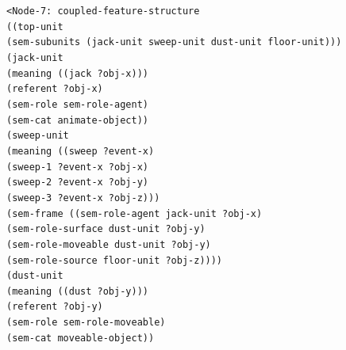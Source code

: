 {\footnotesize{\tt <Node-7: coupled-feature-structure
\\ ((top-unit
\\ \hspace*{5mm} (sem-subunits (jack-unit sweep-unit dust-unit floor-unit)))
\\ \hspace*{2mm}(jack-unit
\\ \hspace*{5mm} (meaning ((jack ?obj-x)))
\\ \hspace*{5mm} (referent ?obj-x)
\\ \hspace*{5mm} (sem-role sem-role-agent)
\\ \hspace*{5mm} (sem-cat animate-object))
\\ \hspace*{2mm}(sweep-unit
\\ \hspace*{5mm} (meaning ((sweep ?event-x)
\\ \hspace*{27mm}(sweep-1 ?event-x ?obj-x)
\\ \hspace*{27mm}(sweep-2 ?event-x ?obj-y)
\\ \hspace*{27mm}(sweep-3 ?event-x ?obj-z)))
\\ \hspace*{5mm} (sem-frame ((sem-role-agent jack-unit ?obj-x)
\\ \hspace*{30mm}(sem-role-surface dust-unit ?obj-y)
\\ \hspace*{30mm}(sem-role-moveable dust-unit ?obj-y)
\\ \hspace*{30mm}(sem-role-source floor-unit ?obj-z))))
\\ \hspace*{2mm}(dust-unit
\\ \hspace*{5mm} (meaning ((dust ?obj-y)))
\\ \hspace*{5mm} (referent ?obj-y)
\\ \hspace*{5mm} (sem-role sem-role-moveable)
\\ \hspace*{5mm} (sem-cat moveable-object))
}}
